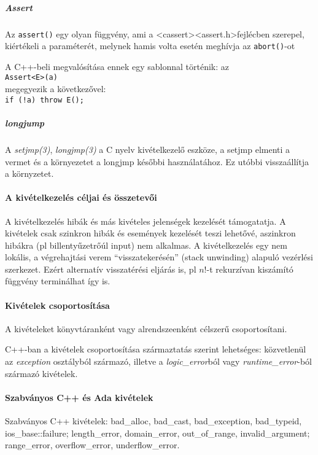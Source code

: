 \documentclass[fleqn,10pt,a4paper]{article}
\newcommand{\ut}[1]{\texttt{#1}}
\theoremstyle{magyar}
\begin{document}
  \subparagraph{Assert} Az \ut{assert()} egy olyan függvény, ami a
  \textless  cassert\textgreater \textless assert.h\textgreater fejlécben
  szerepel, kiértékeli a paraméterét, melynek hamis volta esetén
  meghívja az \ut{abort()}-ot

  A C++-beli megvalósítása ennek egy sablonnal történik: az\\
  \ut{Assert\textless E\textgreater(a)}\\
  megegyezik a következővel:\\
  \ut{if (!a) throw E();}

  \subparagraph{longjump}
  A \emph{setjmp(3)}, \emph{longjmp(3)} a C nyelv kivételkezelő
  eszköze, a setjmp elmenti a vermet és a környezetet a longjmp
  későbbi használatához. Ez utóbbi visszaállítja a környzetet.

  \paragraph{A kivételkezelés céljai és összetevői}
  A kivételkezelés hibák és más kivételes jelenségek kezelését
  támogatatja.
  A kivételek csak szinkron hibák és események kezelését teszi
  lehetővé, aszinkron hibákra (pl billentyűzetrőúl input) nem
  alkalmas.
  A kivételkezelés egy nem lokális, a végrehajtási verem
  ``visszatekerésén'' (stack unwinding) alapuló vezérlési
  szerkezet. Ezért alternatív visszatérési eljárás is, pl $n!$-t
  rekurzívan kiszámító függvény terminálhat így is.
  
  \paragraph{Kivételek csoportosítása}
  A kivételeket könyvtáranként vagy alrendszeenként célszerű
  csoportosítani.
  
  C++-ban a kivételek csoportosítása származtatás szerint lehetséges:
  közvetlenül az \emph{exception} osztályból származó, illetve a
  \emph{logic\_error}ból vagy \emph{runtime\_error}-ból származó kivételek.
  
  \paragraph{Szabványos C++ és Ada kivételek}
  Szabványos C++ kivételek: bad\_alloc, bad\_cast, bad\_exception,
  bad\_typeid, ios\_base::failure; length\_error, domain\_error,
  out\_of\_range, invalid\_argument; range\_error, overflow\_error,
  underflow\_error.
\end{document}
